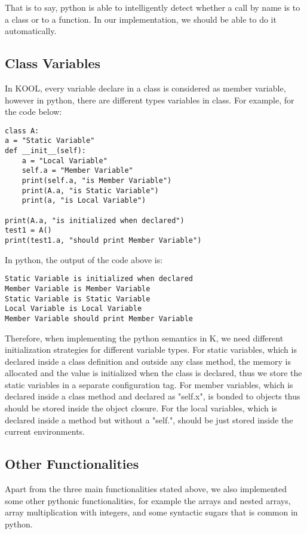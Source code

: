 \documentclass[a4paper]{article}
\begin{document}
That is to say, python is able to intelligently detect whether a call by name is to a class or to a function. In our implementation, we should be able to do it automatically.

\subsection{Class Variables}
In KOOL, every variable declare in a class is considered as member variable, however in python, there are different types variables in class. For example, for the code below:

\begin{lstlisting}
class A:
a = "Static Variable"
def __init__(self):
    a = "Local Variable"
    self.a = "Member Variable"
    print(self.a, "is Member Variable")
    print(A.a, "is Static Variable")
    print(a, "is Local Variable")

print(A.a, "is initialized when declared")
test1 = A()
print(test1.a, "should print Member Variable")
\end{lstlisting}

In python, the output of the code above is:

\begin{lstlisting}
Static Variable is initialized when declared
Member Variable is Member Variable
Static Variable is Static Variable
Local Variable is Local Variable
Member Variable should print Member Variable
\end{lstlisting}

Therefore, when implementing the python semantics in K, we need different initialization strategies for different variable types. For static variables, which is declared inside a class definition and outside any class method, the memory is allocated and the value is initialized when the class is declared, thus we store the static variables in a separate configuration tag. For member variables, which is declared inside a class method and declared as "self.x", is bonded to objects thus should be stored inside the object closure. For the local variables, which is declared inside a method but without a "self.", should be just stored inside the current environments.

\subsection{Other Functionalities}

Apart from the three main functionalities stated above, we also implemented some other pythonic functionalities, for example the arrays and nested arrays, array multiplication with integers, and some syntactic sugars that is common in python.
\end{document}
